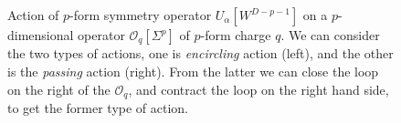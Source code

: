 \documentclass[
  letterpaper,
  DIV=11,
  numbers=noendperiod]{scrreport}
\begin{document}
\begin{figure}

\begin{minipage}[t]{0.50\linewidth}

{\centering 


}

\end{minipage}%
%
\begin{minipage}[t]{0.50\linewidth}

{\centering 


}

\end{minipage}%

\caption{\label{fig-one-form}Action of \(p\)-form symmetry operator
\(U_\alpha[W^{D-p-1}]\) on a \(p\)-dimensional operator
\(\mathcal{O}_q[\Sigma^p]\) of \(p\)-form charge \(q\). We can consider
the two types of actions, one is \emph{encircling} action (left), and
the other is the \emph{passing} action (right). From the latter we can
close the loop on the right of the \(\mathcal{O}_q\), and contract the
loop on the right hand side, to get the former type of action.}

\end{figure}
\end{document}
